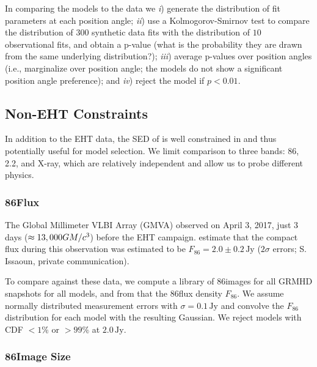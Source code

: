 In comparing the models to the data we
\emph{i}) generate the distribution of fit parameters at each position angle;
\emph{ii}) use a Kolmogorov-Smirnov test to compare the distribution of $300$ synthetic data fits with the distribution of $10$ observational fits, and obtain a p-value (what is the probability they are drawn from the same underlying distribution?);
\emph{iii}) average p-values over position angles (i.e., marginalize over position angle; the models do not show a significant position angle preference); and
\emph{iv}) reject the model if $p < 0.01$.

\subsection{Non-EHT Constraints}

In addition to the EHT data, the SED of \sgra is well constrained in  and thus potentially useful for model selection.
We limit comparison to three bands: 86\GHz, 2.2\um, and X-ray, which are relatively independent and allow us to probe different physics.

\subsubsection{86\GHz Flux}

The Global Millimeter VLBI Array (GMVA) observed \sgra on April 3, 2017, just 3 days ($\approx 13,000 GM/c^3$) before the EHT campaign.
\citet{2019ApJ...871...30I} estimate that the compact flux during this observation was estimated to be $F_{86} = 2.0 \pm 0.2\,\mathrm{Jy}$ ($2\sigma$ errors; S. Issaoun, private communication).

To compare against these data, we compute a library of 86\GHz images for all GRMHD snapshots for all models, and from that the 86\GHz flux density $F_{86}$.  We assume normally distributed measurement errors with $\sigma = 0.1\,\mathrm{Jy}$ and convolve the $F_{86}$ distribution for each model with the resulting Gaussian.  We reject models with CDF $< 1\%$ or $> 99\%$ at $2.0\,\mathrm{Jy}$.

\subsubsection{86\GHz Image Size}

